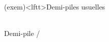 \documentclass[../../main/main.tex]{subfiles}
\begin{document}
\begin{tcb*}(exem)<lftt>{Demi-piles usuelles}
	\noindent
	\hfill
	\begin{minipage}[c]{.30\linewidth}
		\begin{center}
			\\
			Demi-pile /
			\\
		\end{center}
	\end{minipage}
	\hfill
	\begin{minipage}[c]{.30\linewidth}
		\begin{center}
\end{center}
\end{minipage}
\end{tcb*}
\end{document}
